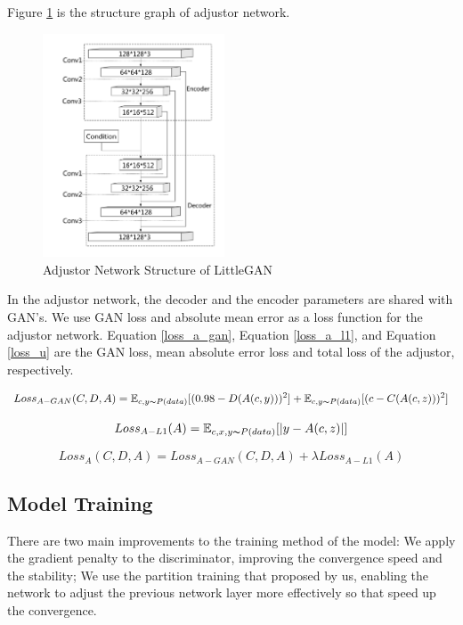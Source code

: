 Figure \ref{net_adjustor} is the structure graph of adjustor network.

\begin{figure}
    \begin{center}
    \includegraphics[width=0.48\textwidth]{figures/net_adjustor.pdf}
    \caption{Adjustor Network Structure of LittleGAN}
    \label{net_adjustor}
    \end{center}
\end{figure}

In the adjustor network, the decoder and the encoder parameters are shared with GAN's.
We use GAN loss and absolute mean error as a loss function for the adjustor network.
Equation \eqref{loss_a_gan}, Equation \eqref{loss_a_l1}, and Equation \eqref{loss_u} are the GAN loss,
    mean absolute error loss and total loss of the adjustor, respectively.

\begin{equation}
    Loss_{A-GAN}(C,D,A)=
    \mathbb{E}_{c,y\thicksim P(data)}[(0.98-D(A(c,y)))^2]+
    \mathbb{E}_{c,y\thicksim P(data)}[(c-C(A(c,z)))^2]
    \label{loss_a_gan}
\end{equation}

\begin{equation}
    Loss_{A-L1}(A)=
    \mathbb{E}_{c,x,y\thicksim P(data)}[|y-A(c,z)|]
    \label{loss_a_l1}
\end{equation}

\begin{equation}
    Loss_{A}(C,D,A)=
    Loss_{A-GAN}(C,D,A)+
    \lambda Loss_{A-L1}(A)
    \label{loss_u}
\end{equation}

\subsection{Model Training}
There are two main improvements to the training method of the model:
    We apply the gradient penalty to the discriminator, improving the convergence speed and the stability;
    We use the partition training that proposed by us,
    enabling the network to adjust the previous network layer more effectively
    so that speed up the convergence.

